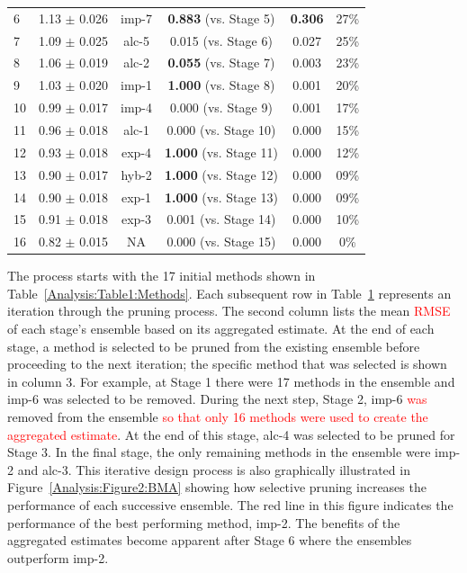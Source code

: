 \documentclass[journal=jpcbfk, manuscript=article]{achemso}
\newcommand{\+}[1]{\ensuremath{\mathbf{#1}}}
\newcommand{\rev}[1]{\textsf{\textcolor{red}{#1}}}
\begin{document}
\begin{table}[t!]
{\begin{tabular}{l|c|c|c|c|c}
		 6 & 1.13 $\pm$ 0.026 & imp-7 & \textbf{0.883}  (vs. Stage 5)& \textbf{0.306} & 27\%\\
		 7 & 1.09 $\pm$ 0.025 & alc-5 & 0.015  (vs. Stage 6) &  0.027 & 25\%\\
		 8 & 1.06 $\pm$ 0.019 & alc-2 & \textbf{0.055}  (vs. Stage 7) & 0.003 & 23\%\\
		 9 & 1.03 $\pm$ 0.020 & imp-1 & \textbf{1.000}  (vs. Stage 8)& 0.001 & 20\%\\
		 10 & 0.99 $\pm$ 0.017 & imp-4 & 0.000  (vs. Stage 9)& 0.001 & 17\%\\
		 11 & 0.96 $\pm$ 0.018 & alc-1 & 0.000  (vs. Stage 10) & 0.000 & 15\%\\														
		 12 & 0.93 $\pm$ 0.018 & exp-4 &  \textbf{1.000}  (vs. Stage 11)& 0.000 & 12\%\\
		 13 & 0.90 $\pm$ 0.017 & hyb-2 & \textbf{1.000}  (vs. Stage 12) &0.000 &  09\%\\															
		 14 & 0.90 $\pm$ 0.018 & exp-1 & \textbf{1.000}   (vs. Stage 13)& 0.000 & 09\%\\															
		 15 & 0.91 $\pm$ 0.018 & exp-3 &   0.001 (vs. Stage 14)&  0.000  & 10\%\\																
		 16 & 0.82 $\pm$ 0.015 & NA  & 0.000   (vs. Stage 15)&0.000 &  0\%\\
		\hline
		\hline
	\end{tabular}}
	\label{Analysis:Table2:BMA}
\end{table}
The process starts with the 17 initial methods shown in Table~\ref{Analysis:Table1:Methods}.
Each subsequent row in Table~\ref{Analysis:Table2:BMA} represents an iteration through the pruning process.
The second column lists the mean \rev{RMSE} of each stage's ensemble based on its aggregated estimate.
At the end of each stage, a method is selected to be pruned from the existing ensemble before proceeding to the next iteration; the specific method that was selected is shown in column 3.
For example, at Stage 1 there were 17 methods in the ensemble and imp-6 was selected to be removed.
During the next step, Stage 2, imp-6 \rev{was} removed from the ensemble \rev{so that only 16 methods were used to create the aggregated estimate}.
At the end of this stage, alc-4 was selected to be pruned for Stage 3.
In the final stage, the only remaining methods in the ensemble were imp-2 and alc-3.
This iterative design process is also graphically illustrated in Figure~\ref{Analysis:Figure2:BMA} showing how selective pruning increases the performance of each successive ensemble.
The red line in this figure indicates the performance of the best performing method, imp-2.
The benefits of the aggregated estimates become apparent after Stage 6 where the ensembles outperform imp-2.
\end{document}
